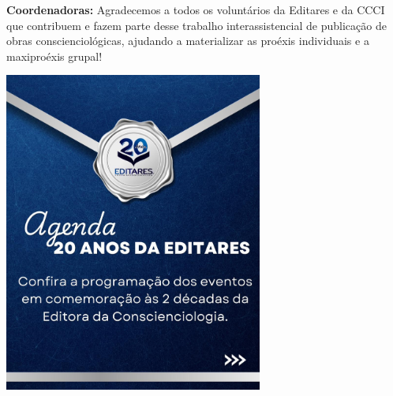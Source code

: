 \documentclass{gescons}
\begin{document}
\begin{multicols}{2}

\textbf{Coordenadoras:} Agradecemos a todos os voluntários da Editares e da CCCI que contribuem e fazem parte desse trabalho interassistencial de publicação de obras conscienciológicas, ajudando a materializar as proéxis individuais e a maxiproéxis grupal!

    \begin{center}
        \includegraphics[width=8.5cm,trim={0 740 0 50},clip]{articles/resumo/fotos/editares-20anos.jpg}
    \end{center}




        
    \end{multicols}



\end{document}
